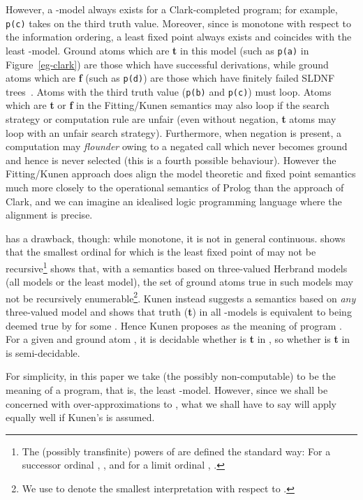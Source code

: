 \documentclass{tlp}
\begin{document}
However, a -model always exists for a Clark-completed program;
for example, \texttt{p(c)} takes on the third truth value.  
Moreover, since  is monotone with respect to the information
ordering, a least fixed point always exists and coincides with
the least -model.
Ground atoms which are \textbf{t} in this model 
(such as \texttt{p(a)} in Figure~\ref{eg-clark})
are those which have successful derivations, while 
ground atoms which are \textbf{f} (such as \texttt{p(d)}) 
are those which have finitely failed SLDNF trees~\cite{Cla78}.
Atoms with the third truth value (\texttt{p(b)} and \texttt{p(c)})
must loop.  
Atoms which are \textbf{t}
or \textbf{f} in the Fitting/Kunen semantics may also loop if the search
strategy or computation rule are unfair (even without negation, \textbf{t}
atoms may loop with an unfair search strategy).  Furthermore, when
negation is present, a computation may \emph{flounder} owing to a negated
call which never becomes ground and hence is never selected (this is a fourth
possible behaviour).  However the Fitting/Kunen
approach does align the model theoretic and fixed point semantics much more
closely to the operational semantics of Prolog than the approach of
Clark, and we can imagine an idealised logic programming language where
the alignment is precise.

 has a drawback, though: while monotone, it is not in general 
continuous.
 shows that the smallest ordinal  for which 
 is the least fixed point of  may not be
recursive\footnote{The (possibly transfinite) powers of  are
defined the standard way: For a successor ordinal ,
, 
and for a limit ordinal , 
.}
 shows that, with a semantics based on three-valued
Herbrand models (all models or the least model), the set of ground
atoms true in such models may not be recursively enumerable\footnote{We use  to denote the smallest interpretation with respect to 
.}.
Kunen instead suggests a semantics based on \emph{any} three-valued
model and shows that truth (\textbf{t}) in all -models is
equivalent to being deemed true by  for some .
Hence Kunen proposes  as the meaning of program .
For a given  and ground atom , it is decidable whether
 is \textbf{t} in , so whether  is \textbf{t} in 
 is semi-decidable.

For simplicity, in this paper we take (the possibly non-computable) 
 to be the meaning of a program, that is, the
least -model.
However, since we shall be concerned with over-approximations to
, what we shall have to say will apply equally well if Kunen's
 is assumed.
\end{document}
